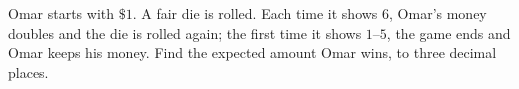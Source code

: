 Omar starts with $\$1$. A fair die is rolled. Each time it shows $6$, Omar's money doubles and the die is rolled again; the first time it shows $1$--$5$, the game ends and Omar keeps his money. Find the expected amount Omar wins, to three decimal places.
